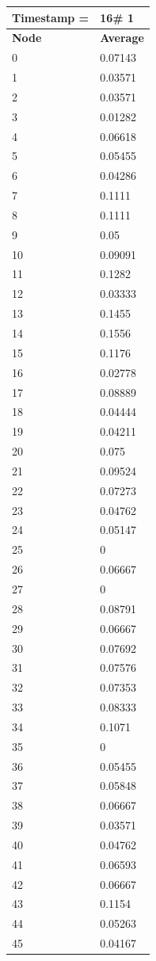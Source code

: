 \begin{tabular}{|l||l|}
\hline
\textbf{Timestamp =} & \textbf{16}\# 1\\\hline
	\textbf{Node} & \textbf{Average} \\ \hline
\hline
	0 & 0.07143 \\ \hline
	1 & 0.03571 \\ \hline
	2 & 0.03571 \\ \hline
	3 & 0.01282 \\ \hline
	4 & 0.06618 \\ \hline
	5 & 0.05455 \\ \hline
	6 & 0.04286 \\ \hline
	7 & 0.1111 \\ \hline
	8 & 0.1111 \\ \hline
	9 & 0.05 \\ \hline
	10 & 0.09091 \\ \hline
	11 & 0.1282 \\ \hline
	12 & 0.03333 \\ \hline
	13 & 0.1455 \\ \hline
	14 & 0.1556 \\ \hline
	15 & 0.1176 \\ \hline
	16 & 0.02778 \\ \hline
	17 & 0.08889 \\ \hline
	18 & 0.04444 \\ \hline
	19 & 0.04211 \\ \hline
	20 & 0.075 \\ \hline
	21 & 0.09524 \\ \hline
	22 & 0.07273 \\ \hline
	23 & 0.04762 \\ \hline
	24 & 0.05147 \\ \hline
	25 & 0 \\ \hline
	26 & 0.06667 \\ \hline
	27 & 0 \\ \hline
	28 & 0.08791 \\ \hline
	29 & 0.06667 \\ \hline
	30 & 0.07692 \\ \hline
	31 & 0.07576 \\ \hline
	32 & 0.07353 \\ \hline
	33 & 0.08333 \\ \hline
	34 & 0.1071 \\ \hline
	35 & 0 \\ \hline
	36 & 0.05455 \\ \hline
	37 & 0.05848 \\ \hline
	38 & 0.06667 \\ \hline
	39 & 0.03571 \\ \hline
	40 & 0.04762 \\ \hline
	41 & 0.06593 \\ \hline
	42 & 0.06667 \\ \hline
	43 & 0.1154 \\ \hline
	44 & 0.05263 \\ \hline
	45 & 0.04167 \\ \hline
\end{tabular}

